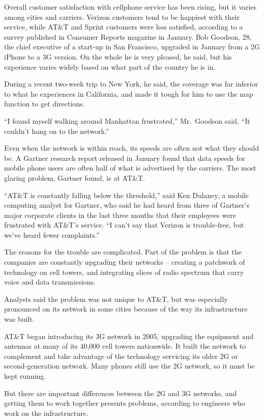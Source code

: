 \documentclass[12pt,a4paper,onecolumn]{article}
\begin{document}
\begin{CJK*}{GBK}{song}
Overall customer satisfaction with cellphone service has been rising, but it varies among cities and
carriers. Verizon customers tend to be happiest with their service, while AT\&T and Sprint customers
were less satisfied, according to a survey published in Consumer Reports magazine in January. Bob
Goodson, 28, the chief executive of a start-up in San Francisco, upgraded in January from a 2G
iPhone to a 3G version. On the whole he is very pleased, he said, but his experience varies widely
based on what part of the country he is in.

During a recent two-week trip to New York, he said, the coverage was far inferior to what he
experiences in California, and made it tough for him to use the map function to get directions.

``I found myself walking around Manhattan frustrated,'' Mr.~Goodson said. ``It couldn't hang on to
the network.''

Even when the network is within reach, its speeds are often not what they should be. A Gartner
research report released in January found that data speeds for mobile phone users are often half of
what is advertised by the carriers. The most glaring problem, Gartner found, is at AT\&T.

``AT\&T is constantly falling below the threshold,'' said Ken Dulaney, a mobile computing analyst
for Gartner, who said he had heard from three of Gartner's major corporate clients in the last three
months that their employees were frustrated with AT\&T's service. ``I can't say that Verizon is
trouble-free, but we've heard fewer complaints.''

The reasons for the trouble are complicated. Part of the problem is that the companies are
constantly upgrading their networks -- creating a patchwork of technology on cell towers, and
integrating slices of radio spectrum that carry voice and data transmissions.

Analysts said the problem was not unique to AT\&T, but was especially pronounced on its network in
some cities because of the way its infrastructure was built.

AT\&T began introducing its 3G network in 2005, upgrading the equipment and antennas at many of its
40,000 cell towers nationwide. It built the network to complement and take advantage of the
technology servicing its older 2G or second-generation network. Many phones still use the 2G
network, so it must be kept running.

But there are important differences between the 2G and 3G networks, and getting them to work
together presents problems, according to engineers who work on the infrastructure.


\end{CJK*}
\end{document}
